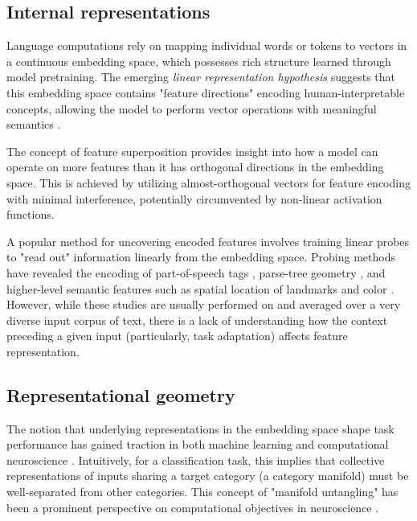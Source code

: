 \subsection{Internal representations}
Language computations rely on mapping individual words or tokens to vectors in a continuous embedding space, which possesses rich structure learned through model pretraining. The emerging \textit{linear representation hypothesis} \cite{park2024linearrepresentationhypothesisgeometry} suggests that this embedding space contains "feature directions" encoding human-interpretable concepts, allowing the model to perform vector operations with meaningful semantics \cite{mikolov2013efficientestimationwordrepresentations,pennington-etal-2014-glove, bowman2016generatingsentencescontinuousspace}.

The concept of feature superposition \cite{elhage2022toymodelssuperposition,arora2018linearalgebraicstructureword} provides insight into how a model can operate on more features than it has orthogonal directions in the embedding space. This is achieved by utilizing almost-orthogonal vectors for feature encoding with minimal interference, potentially circumvented by non-linear activation functions.

A popular method for uncovering encoded features involves training linear probes \cite{belinkov2021probingclassifierspromisesshortcomings} to "read out" information linearly from the embedding space. Probing methods have revealed the encoding of part-of-speech tags \cite{belinkov-etal-2017-neural}, parse-tree geometry \cite{hewitt-manning-2019-structural}, and higher-level semantic features such as spatial location of landmarks \cite{gurnee2024languagemodelsrepresentspace} and color \cite{abdou-etal-2021-language}. However, while these studies are usually performed on and averaged over a very diverse input corpus of text, there is a lack of understanding how the context preceding a given input (particularly, task adaptation) affects feature representation.

\subsection{Representational geometry}

The notion that underlying representations in the embedding space shape task performance has gained traction in both machine learning and computational neuroscience \cite{chungNeuralPopulationGeometry2021,fleschOrthogonalRepresentationsRobust2022, ansuiniIntrinsicDimensionData, fawziEmpiricalStudyTopology2018}. Intuitively, for a classification task, this implies that collective representations of inputs sharing a target category (a category manifold) must be well-separated from other categories. This concept of "manifold untangling" has been a prominent perspective on computational objectives in neuroscience \cite{dicarloUntanglingInvariantObject2007}.

